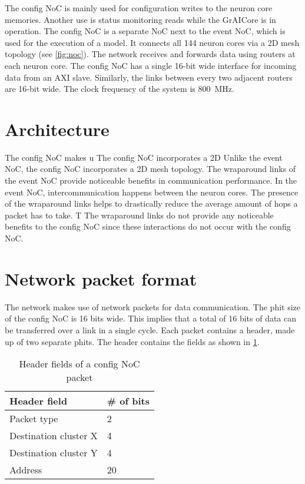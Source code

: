 The config NoC is mainly used for configuration writes to the neuron core memories.
Another use is status monitoring reads while the GrAICore is in operation.
The config NoC is a separate NoC next to the event NoC, which is used for the execution of a model.
It connects all 144 neuron cores via a 2D mesh topology (see \cref{fig:noc}).
The network receives and forwards data using routers at each neuron core.
The config NoC has a single 16-bit wide interface for incoming data from an AXI slave.
Similarly, the links between every two adjacent routers are 16-bit wide. 
The clock frequency of the system is \SI{800}{MHz}.


\section{Architecture}
\lipsum[1]
% 
The config NoC makes u
The config NoC incorporates a 2D 
Unlike the event NoC, the config NoC incorporates a 2D mesh topology.
The wraparound links of the event NoC provide noticeable benefits in communication performance.
In the event NoC, intercommunication happens between the neuron cores.
The presence of the wraparound links helps to drastically reduce the average amount of hops a packet has to take.
T
The wraparound links do not provide any noticeable benefits to the config NoC since these interactions do not occur with the config NoC.


\section{Network packet format}
The network makes use of network packets for data communication.
The phit size of the config NoC is 16 bits wide.
This implies that a total of 16 bits of data can be transferred over a link in a single cycle.
Each packet contains a header, made up of two separate phits.
The header contains the fields as shown in \cref{tab:header_fields}.

\begin{table}[hbtp]
\centering
\begin{tabular}{@{}ll@{}}
\toprule
\textbf{Header field} & \textbf{\# of bits} \\ \midrule
Packet type           & 2                   \\
Destination cluster X & 4                   \\
Destination cluster Y & 4                   \\
Address               & 20                  \\ \bottomrule
\end{tabular}
\caption{Header fields of a config NoC packet}
\label{tab:header_fields}
\end{table}

